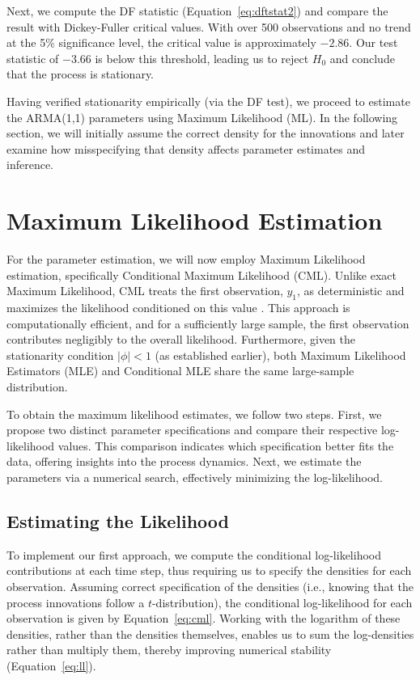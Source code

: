\documentclass[a4paper,12pt]{article}
\begin{document}
Next, we compute the DF statistic (Equation~\ref{eq:dftstat2}) and compare the result with Dickey-Fuller critical values. With over 500 observations and no trend at the 5\% significance level, the critical value is approximately \(-2.86\). Our test statistic of \(-3.66\) is below this threshold, leading us to reject \(H_0\) and conclude that the process is stationary.

Having verified stationarity empirically (via the DF test), we proceed to estimate the ARMA(1,1) parameters using Maximum Likelihood (ML). In the following section, we will initially assume the correct density for the innovations and later examine how misspecifying that density affects parameter estimates and inference.

\section{Maximum Likelihood Estimation}
For the parameter estimation, we will now employ Maximum Likelihood estimation, specifically Conditional Maximum Likelihood (CML). Unlike exact Maximum Likelihood, CML treats the first observation, \(y_1\), as deterministic and maximizes the likelihood conditioned on this value \citep[pp.~122--123]{Hamilton1994}. This approach is computationally efficient, and for a sufficiently large sample, the first observation contributes negligibly to the overall likelihood. Furthermore, given the stationarity condition \(\lvert \phi \rvert < 1\) (as established earlier), both Maximum Likelihood Estimators (MLE) and Conditional MLE share the same large-sample distribution.

To obtain the maximum likelihood estimates, we follow two steps. First, we propose two distinct parameter specifications and compare their respective log-likelihood values. This comparison indicates which specification better fits the data, offering insights into the process dynamics. Next, we estimate the parameters via a numerical search, effectively minimizing the log-likelihood.

\subsection{Estimating the Likelihood}
To implement our first approach, we compute the conditional log-likelihood contributions at each time step, thus requiring us to specify the densities for each observation. Assuming correct specification of the densities (i.e., knowing that the process innovations follow a \(t\)-distribution), the conditional log-likelihood for each observation is given by Equation~\ref{eq:cml}. Working with the logarithm of these densities, rather than the densities themselves, enables us to sum the log-densities rather than multiply them, thereby improving numerical stability (Equation~\ref{eq:ll}).
\end{document}

